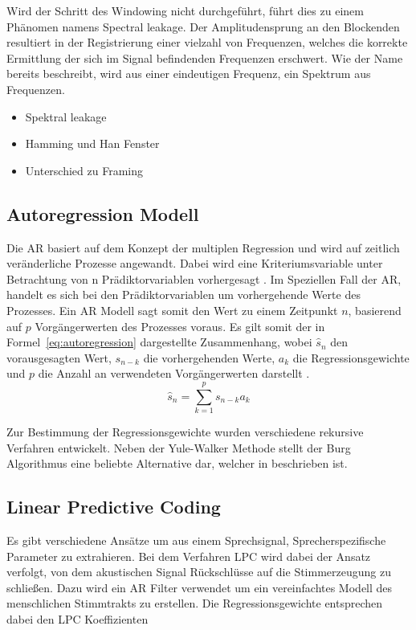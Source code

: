 Wird der Schritt des Windowing nicht durchgeführt, führt dies zu einem Phänomen namens Spectral leakage.
Der Amplitudensprung an den Blockenden resultiert in der Registrierung einer vielzahl von Frequenzen, welches die korrekte Ermittlung der sich im Signal befindenden Frequenzen erschwert.
Wie der Name bereits beschreibt, wird aus einer eindeutigen Frequenz, ein Spektrum aus Frequenzen.

\begin{itemize}
  \item Spektral leakage
  \item Hamming und Han Fenster
  \item Unterschied zu Framing
\end{itemize}
\subsection{Autoregression Modell}
Die \ac{AR} basiert auf dem Konzept der multiplen Regression und wird auf zeitlich veränderliche Prozesse angewandt.
Dabei wird eine Kriteriumsvariable unter Betrachtung von n Prädiktorvariablen vorhergesagt \autocite[vgl.][S. 37-38]{canela_multiple_2019}.
Im Speziellen Fall der \ac{AR}, handelt es sich bei den Prädiktorvariablen um vorhergehende Werte des Prozesses.
Ein \ac{AR} Modell sagt somit den Wert zu einem Zeitpunkt $n$, basierend auf $p$ Vorgängerwerten des Prozesses voraus.
Es gilt somit der in Formel~\ref{eq:autoregression} dargestellte Zusammenhang, wobei $\hat{s}_n$ den vorausgesagten Wert, $s_{n-k}$ die vorhergehenden Werte, $a_{k}$ die Regressionsgewichte und $p$ die Anzahl an verwendeten Vorgängerwerten darstellt \autocite[][S. 1304]{atal_effectiveness_1974}.
\begin{equation}
  \hat{s}_{n} = \sum_{k=1}^{p} s_{n-k}a_{k}
  \label{eq:autoregression}
\end{equation}

Zur Bestimmung der Regressionsgewichte wurden verschiedene rekursive Verfahren entwickelt.
Neben der Yule-Walker Methode stellt der Burg Algorithmus eine beliebte Alternative dar, welcher in \citeauthor[][S. 443]{marple_new_1980} beschrieben ist.

\subsection{Linear Predictive Coding}
Es gibt verschiedene Ansätze um aus einem Sprechsignal, Sprecherspezifische Parameter zu extrahieren.
Bei dem Verfahren \ac{LPC} wird dabei der Ansatz verfolgt, von dem akustischen Signal Rückschlüsse auf die Stimmerzeugung zu schließen.
Dazu wird ein \ac{AR} Filter verwendet um ein vereinfachtes Modell des menschlichen Stimmtrakts zu erstellen.
Die Regressionsgewichte entsprechen dabei den \ac{LPC} Koeffizienten

